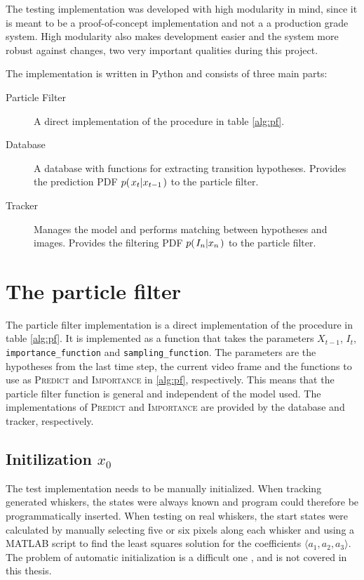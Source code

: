 The testing implementation was developed with high modularity in
mind, since it is meant to be a proof-of-concept implementation and
not a a production grade system. High modularity also makes
development easier and the system more robust against changes, two
very important qualities during this project.

The implementation is written in Python and consists of three main parts:
\begin{description}
  \item[Particle Filter] A direct  implementation of the procedure in
    table \ref{alg:pf}.
  \item[Database] A database with functions for extracting transition
    hypotheses. Provides the prediction PDF $p{(\left. x_t \middle\vert x_{t-1} \right.)}$ to the
    particle filter.
  \item[Tracker] Manages the model and performs matching between
    hypotheses and images. Provides the filtering PDF
    $p{(\left. I_n \middle\vert x_n \right.)}$ to the particle filter.
\end{description}

\section{The particle filter}
The particle filter implementation is a direct implementation of the
procedure in table \ref{alg:pf}. It is implemented as a function that
takes the parameters $X_{t-1}$, $I_t$, \texttt{importance\_function} and
\texttt{sampling\_function}. The parameters are the hypotheses from
the last time step, the current video frame and the functions to use
as \textsc{Predict} and \textsc{Importance} in \ref{alg:pf},
respectively. This means that the particle filter function is general
and independent of the model used. The implementations of
\textsc{Predict} and \textsc{Importance} are provided by the database
and tracker, respectively.

\subsection{Initilization $x_0$}
The test implementation needs to be manually initialized. When
tracking generated whiskers, the states were always known and program
could therefore be programmatically inserted. When testing on real
whiskers, the start states were calculated by manually selecting five
or six pixels along each whisker and using a MATLAB script to find the
least squares solution for the coefficients $\langle a_1, a_2, a_3
\rangle$. The problem of automatic initialization is a difficult one
\cite{Hedvig}, and is not covered in this thesis.

